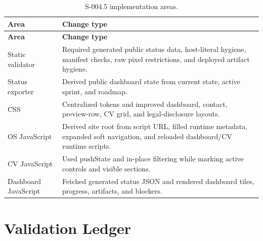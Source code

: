 \documentclass[a4paper,11pt,openany]{report}
\begin{document}
\begin{longtable}{p{} p{}}
\caption{S-004.5 implementation areas.}\\
\toprule
\textbf{Area} & \textbf{Change type} \\
\midrule
\endfirsthead
\toprule
\textbf{Area} & \textbf{Change type} \\
\midrule
\endhead
Static validator & Required generated public status data, host-literal hygiene, manifest checks, raw pixel restrictions, and deployed artifact hygiene. \\
Status exporter & Derived public dashboard state from current state, active sprint, and roadmap. \\
CSS & Centralized tokens and improved dashboard, contact, preview-row, CV grid, and legal-disclosure layouts. \\
OS JavaScript & Derived site root from script URL, filled runtime metadata, expanded soft navigation, and reloaded dashboard/CV runtime scripts. \\
CV JavaScript & Used pushState and in-place filtering while marking active controls and visible sections. \\
Dashboard JavaScript & Fetched generated status JSON and rendered dashboard tiles, progress, artifacts, and blockers. \\
\bottomrule
\end{longtable}

\chapter{Validation Ledger}
\end{document}

